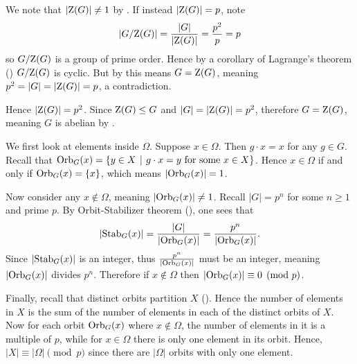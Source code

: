 \begin{questions}
    We note that $|\mathrm{Z}(G)| \neq 1$ by . If instead $|\mathrm{Z}(G)| = p$, note
    \[
        |G/\mathrm{Z}(G)| = \frac{|G|}{|\mathrm{Z}(G)|} = \frac{p^2}{p} = p
    \]
    so $G/\mathrm{Z}(G)$ is a group of prime order. Hence by a corollary of Lagrange's theorem () $G/\mathrm{Z}(G)$ is cyclic. But by  this means $G = \mathrm{Z}(G)$, meaning $p^2 = |G| = |\mathrm{Z}(G)| = p$, a contradiction.

    Hence $|\mathrm{Z}(G)| = p^2$. Since $\mathrm{Z}(G) \leq G$ and $|G| = |\mathrm{Z}(G)| = p^2$, therefore $G = \mathrm{Z}(G)$, meaning $G$ is abelian by .

    \item We first look at elements inside $\Omega$. Suppose $x \in \Omega$. Then $g \cdot x = x$ for any $g \in G$. Recall that $\Orb{G}{x} = \{y \in X \vert g \cdot x = y \text{ for some } x \in X\}$. Hence $x \in \Omega$ if and only if $\mathrm{Orb}_{G}(x) = \{x\}$, which means $|\mathrm{Orb}_{G}(x)| = 1$.

    Now consider any $x \notin \Omega$, meaning $|\mathrm{Orb}_{G}(x)| \neq 1$. Recall $|G| = p^n$ for some $n \geq 1$ and prime $p$. By Orbit-Stabilizer theorem (), one sees that
    \[
        |\mathrm{Stab}_{G}(x)| = \frac{|G|}{|\mathrm{Orb}_{G}(x)|} = \frac{p^n}{|\mathrm{Orb}_{G}(x)|}.
    \]
    Since $|\mathrm{Stab}_{G}(x)|$ is an integer, thus $\frac{p^n}{|\mathrm{Orb}_{G}(x)|}$ must be an integer, meaning $|\mathrm{Orb}_{G}(x)|$ divides $p^n$. Therefore if $x \notin \Omega$ then $|\mathrm{Orb}_{G}(x)| \equiv 0 \pmod p$.

    Finally, recall that distinct orbits partition $X$ (). Hence the number of elements in $X$ is the sum of the number of elements in each of the distinct orbits of $X$. Now for each orbit $\mathrm{Orb}_{G}(x)$ where $x \notin \Omega$, the number of elements in it is a multiple of $p$, while for $x \in \Omega$ there is only one element in its orbit. Hence, $|X| \equiv |\Omega| \pmod p$ since there are $|\Omega|$ orbits with only one element.
\end{questions}
